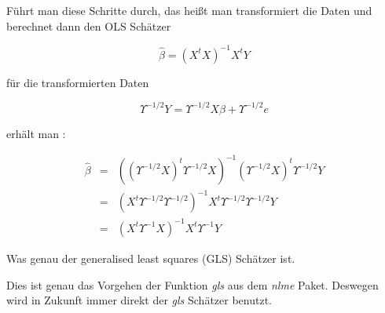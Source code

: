 \documentclass[12pt,a4paper]{article}
\theoremstyle{definition}
\theoremstyle{definition}
\theoremstyle{definition}
\theoremstyle{definition}
\begin{document}
Führt man diese Schritte durch, das heißt man transformiert die Daten und berechnet dann den OLS Schätzer 

\begin{equation*}
\hat{\beta} = (X^{t} X)^{-1} X^{t} Y
\end{equation*}

für die transformierten Daten 

\begin{equation*}
\Upsilon^{-1/2} Y = \Upsilon^{-1/2} X \beta + \Upsilon^{-1/2} e
\end{equation*}

erhält man :

\begin{eqnarray*}
\hat{\beta} &=& ((\Upsilon^{-1/2} X)^{t} \Upsilon^{-1/2} X)^{-1} (\Upsilon^{-1/2} X)^{t} \Upsilon^{-1/2} Y \\
&=& (X^{t} \Upsilon^{-1/2} \Upsilon^{-1/2})^{-1} X^{t} \Upsilon^{-1/2} \Upsilon^{-1/2} Y \\
&=& (X^{t} \Upsilon^{-1} X)^{-1} X^{t} \Upsilon^{-1} Y
\end{eqnarray*}
 
Was genau der generalised least squares (GLS) Schätzer ist.

Dies ist genau das Vorgehen der Funktion \textit{gls} aus dem \textit{nlme} Paket. Deswegen wird in Zukunft immer direkt der \textit{gls} Schätzer benutzt.
\end{document}
